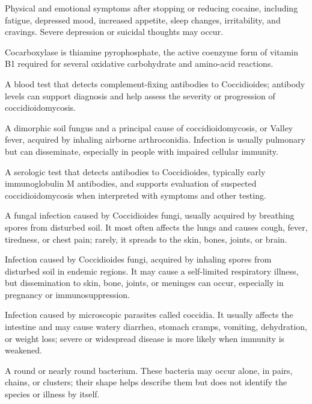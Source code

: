  Physical and emotional symptoms after stopping or reducing cocaine, including fatigue, depressed mood, increased appetite, sleep changes, irritability, and cravings. Severe depression or suicidal thoughts may occur.

 Cocarboxylase is thiamine pyrophosphate, the active coenzyme form of vitamin B1 required for several oxidative carbohydrate and amino-acid reactions.

 A blood test that detects complement-fixing antibodies to Coccidioides; antibody levels can support diagnosis and help assess the severity or progression of coccidioidomycosis.

 A dimorphic soil fungus and a principal cause of coccidioidomycosis, or Valley fever, acquired by inhaling airborne arthroconidia. Infection is usually pulmonary but can disseminate, especially in people with impaired cellular immunity.

 A serologic test that detects antibodies to Coccidioides, typically early immunoglobulin M antibodies, and supports evaluation of suspected coccidioidomycosis when interpreted with symptoms and other testing.

 A fungal infection caused by Coccidioides fungi, usually acquired by breathing spores from disturbed soil. It most often affects the lungs and causes cough, fever, tiredness, or chest pain; rarely, it spreads to the skin, bones, joints, or brain.

 Infection caused by Coccidioides fungi, acquired by inhaling spores from disturbed soil in endemic regions. It may cause a self-limited respiratory illness, but dissemination to skin, bone, joints, or meninges can occur, especially in pregnancy or immunosuppression.

 Infection caused by microscopic parasites called coccidia. It usually affects the intestine and may cause watery diarrhea, stomach cramps, vomiting, dehydration, or weight loss; severe or widespread disease is more likely when immunity is weakened.

 A round or nearly round bacterium. These bacteria may occur alone, in pairs, chains, or clusters; their shape helps describe them but does not identify the species or illness by itself.

